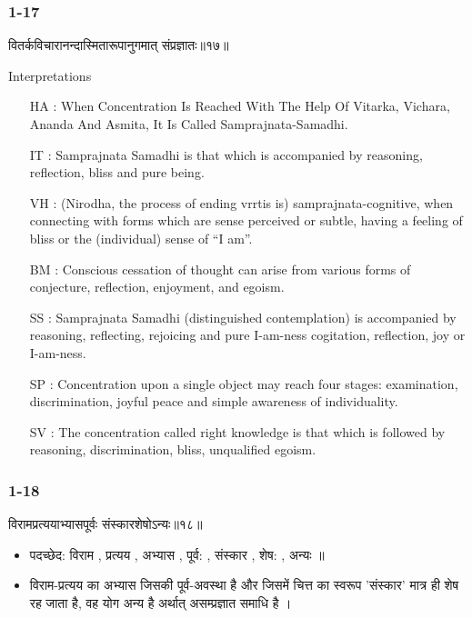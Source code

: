 \begin{frame}[fragile]\frametitle{1-17}
\begin{sanskrit}
वितर्कविचारानन्दास्मितारूपानुगमात् संप्रज्ञातः॥१७॥
\end{sanskrit}

Interpretations
\begin{itemize}		
\item [HA]: When Concentration Is Reached With The Help Of Vitarka, Vichara, Ananda And Asmita, It Is Called Samprajnata-Samadhi.
\item [IT]: Samprajnata Samadhi is that which is accompanied by reasoning, reflection, bliss and pure being.
\item [VH]: (Nirodha, the process of ending vrrtis is) samprajnata-cognitive, when connecting with forms which are sense perceived or subtle, having a feeling of bliss or the (individual) sense of “I am”.
\item [BM]: Conscious cessation of thought can arise from various forms of conjecture, reflection, enjoyment, and egoism.
\item [SS]: Samprajnata Samadhi (distinguished contemplation) is accompanied by reasoning, reflecting, rejoicing and pure I-am-ness cogitation, reflection, joy or I-am-ness.
\item [SP]: Concentration upon a single object may reach four stages: examination, discrimination, joyful peace and simple awareness of individuality.
\item [SV]: The concentration called right knowledge is that which is followed by reasoning, discrimination, bliss, unqualified egoism. 
\end{itemize}
	
\end{frame}

\begin{frame}[fragile]\frametitle{1-18}
\begin{sanskrit}
विरामप्रत्ययाभ्यासपूर्वः संस्कारशेषोऽन्यः॥१८॥
\end{sanskrit}

\begin{itemize}
\item पदच्छेद: विराम , प्रत्यय , अभ्यास , पूर्व: , संस्कार , शेष: , अन्यः ॥
\item विराम-प्रत्यय का अभ्यास जिसकी पूर्व-अवस्था है और जिसमें चित्त का स्वरूप 'संस्कार' मात्र ही शेष रह जाता है, वह योग अन्य है अर्थात् असम्प्रज्ञात समाधि है ।
\end{itemize}
	
\end{frame}

